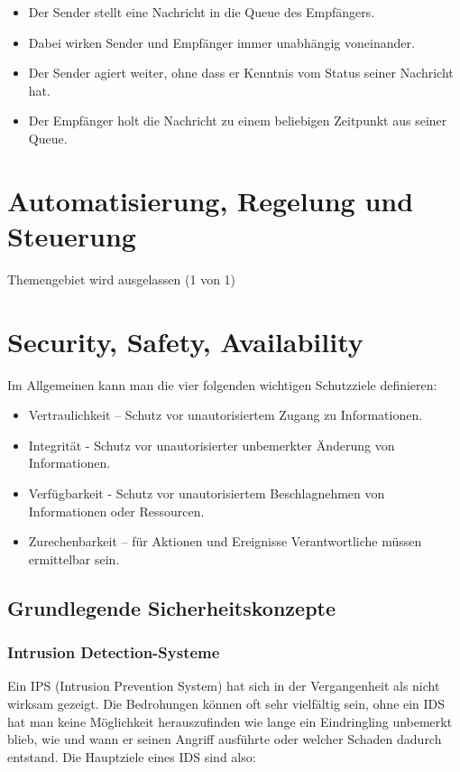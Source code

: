 \documentclass[letterpaper, 12pt]{article}
\let\tempsection\section
\renewcommand\section[1]{\vspace{-0.3cm}\tempsection{#1}\vspace{-0.3cm}}
\let\tempsubsection\subsection
\renewcommand\subsection[1]{\vspace{0cm}\tempsubsection{#1}\vspace{0cm}}
\let\tempsubsubsection\subsubsection
\renewcommand\subsubsection[1]{\vspace{0cm}\tempsubsubsection{#1}\vspace{0cm}}
\begin{document}
\begin{itemize}
	\item Der Sender stellt eine Nachricht in die Queue des Empfängers.
	\item Dabei wirken Sender und Empfänger immer unabhängig voneinander.
	\item Der Sender agiert weiter, ohne dass er Kenntnis vom Status seiner Nachricht hat.
	\item Der Empfänger holt die Nachricht zu einem beliebigen Zeitpunkt aus seiner Queue. \cite{mom}
\end{itemize}

\section{Automatisierung, Regelung und Steuerung}

Themengebiet wird ausgelassen (1 von 1)

\clearpage

\section{Security, Safety, Availability}

Im Allgemeinen kann man die vier folgenden wichtigen Schutzziele definieren:

\begin{itemize}
	\item Vertraulichkeit – Schutz vor unautorisiertem Zugang zu Informationen.
	\item Integrität - Schutz vor unautorisierter unbemerkter Änderung von Informationen.
	\item Verfügbarkeit - Schutz vor unautorisiertem Beschlagnehmen von Informationen
oder Ressourcen.
	\item Zurechenbarkeit – für Aktionen und Ereignisse Verantwortliche müssen ermittelbar
sein.
\end{itemize}

\subsection{Grundlegende Sicherheitskonzepte}

\subsubsection{Intrusion Detection-Systeme}

Ein IPS (Intrusion Prevention System) hat sich in der Vergangenheit als nicht wirksam gezeigt. Die Bedrohungen können oft sehr vielfältig sein, ohne ein IDS hat man keine Möglichkeit herauszufinden
wie lange ein Eindringling unbemerkt blieb, wie und wann er seinen Angriff
ausführte oder welcher Schaden dadurch entstand. Die Hauptziele eines IDS sind also:
\end{document}
